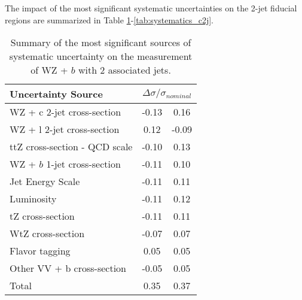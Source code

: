 



The impact of the most significant systematic uncertainties on the 2-jet fiducial regions are summarized in Table \ref{tab:systematics_b2j}-\ref{tab:systematics_c2j}. 

\begin{table}[H]
  \centering
    \begin{tabular}{l|cc}
        \hline\hline
        Uncertainty Source & \multicolumn{2}{c}{$\Delta \sigma/\sigma_{nominal}$ }  \\
        \hline
        WZ + c 2-jet cross-section & -0.13 & 0.16 \\
        WZ + l 2-jet cross-section & 0.12 & -0.09 \\
        ttZ cross-section - QCD scale & -0.10 & 0.13 \\
        WZ + $b$ 1-jet cross-section & -0.11 & 0.10 \\
        Jet Energy Scale & -0.11 & 0.11 \\
        Luminosity & -0.11 & 0.12 \\
        tZ cross-section & -0.11 & 0.11 \\
        WtZ cross-section & -0.07 & 0.07 \\
        Flavor tagging  & 0.05 & 0.05 \\
        Other VV + b cross-section & -0.05 & 0.05 \\
        \hline
        Total & 0.35 & 0.37 \\
        \hline\hline
    \end{tabular}
    \caption{Summary of the most significant sources of systematic uncertainty on the measurement of WZ + $b$ with 2 associated jets.}
    \label{tab:systematics_b2j}
\end{table}


